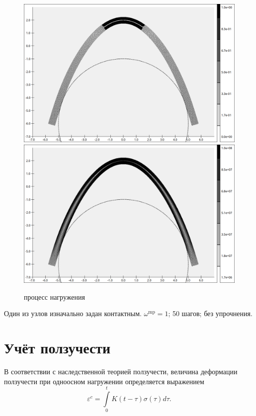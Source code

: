 \begin{figure}[!h]
	\includegraphics[height=0.2\textheight]{pictures/3.png}
	\includegraphics[height=0.2\textheight]{pictures/3_eqv.png}
	\caption{процесс нагружения}
	\label{fig:test0}
\end{figure}
Один из узлов изначально задан контактным. $\omega^{\mathrm{mp}}=1$; 50 шагов; без упрочнения.

\section{Учёт ползучести}
В соответствии с наследственной теорией ползучести, величина деформации ползучести при одноосном нагружении определяется выражением \cite{Radchenko2005}
\begin{equation}
\varepsilon^{c}=\int\limits_0^t K\left(t-\tau\right) \sigma\left(\tau \right)d\tau.
\label{F:F_creep_1d}
\end{equation}

